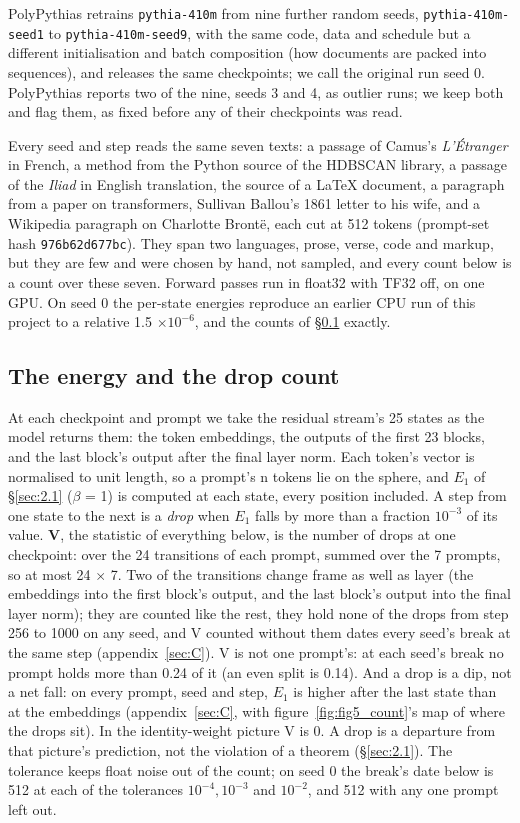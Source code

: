 \documentclass[11pt]{article}
\begin{document}
PolyPythias \citep{vanderwal2025} retrains \texttt{pythia-410m} from nine further random seeds, \texttt{pythia-410m-seed1} to \texttt{pythia-410m-seed9}, with the same code, data and schedule but a different initialisation and batch composition (how documents are packed into sequences), and releases the same checkpoints; we call the original run seed 0. PolyPythias reports two of the nine, seeds 3 and 4, as outlier runs; we keep both and flag them, as fixed before any of their checkpoints was read.

Every seed and step reads the same seven texts: a passage of Camus's \emph{L'Étranger} in French, a method from the Python source of the HDBSCAN library, a passage of the \emph{Iliad} in English translation, the source of a LaTeX document, a paragraph from a paper on transformers, Sullivan Ballou's 1861 letter to his wife, and a Wikipedia paragraph on Charlotte Brontë, each cut at 512 tokens (prompt-set hash \texttt{976b62d677bc}). They span two languages, prose, verse, code and markup, but they are few and were chosen by hand, not sampled, and every count below is a count over these seven. Forward passes run in float32 with TF32 off, on one GPU. On seed 0 the per-state energies reproduce an earlier CPU run of this project to a relative 1.5 $\times 10^{-6}$, and the counts of \S\ref{sec:3.2} exactly.

\subsection{The energy and the drop count}\label{sec:3.2}

At each checkpoint and prompt we take the residual stream's 25 states as the model returns them: the token embeddings, the outputs of the first 23 blocks, and the last block's output after the final layer norm. Each token's vector is normalised to unit length, so a prompt's n tokens lie on the sphere, and $E_{1}$ of \S\ref{sec:2.1} ($\beta $ = 1) is computed at each state, every position included. A step from one state to the next is a \emph{drop} when $E_{1}$ falls by more than a fraction $10^{-3}$ of its value. \textbf{V}, the statistic of everything below, is the number of drops at one checkpoint: over the 24 transitions of each prompt, summed over the 7 prompts, so at most 24 $\times $ 7. Two of the transitions change frame as well as layer (the embeddings into the first block's output, and the last block's output into the final layer norm); they are counted like the rest, they hold none of the drops from step 256 to 1000 on any seed, and V counted without them dates every seed's break at the same step (appendix~\ref{sec:C}). V is not one prompt's: at each seed's break no prompt holds more than 0.24 of it (an even split is 0.14). And a drop is a dip, not a net fall: on every prompt, seed and step, $E_{1}$ is higher after the last state than at the embeddings (appendix~\ref{sec:C}, with figure~\ref{fig:fig5_count}'s map of where the drops sit). In the identity-weight picture V is 0. A drop is a departure from that picture's prediction, not the violation of a theorem (\S\ref{sec:2.1}). The tolerance keeps float noise out of the count; on seed 0 the break's date below is 512 at each of the tolerances $10^{-4}, 10^{-3}$ and $10^{-2}$, and 512 with any one prompt left out.
\end{document}

